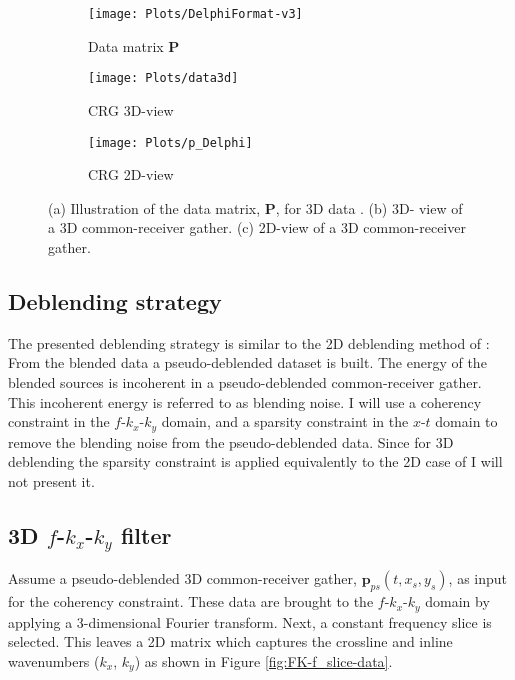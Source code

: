 \documentclass{madrid15WS}
\begin{document}
\begin{figure}[h!]
	
	\centering
	\begin{subfigure}[t]{0.4\textwidth}
		\centering
		\texttt{[image: Plots/DelphiFormat-v3]}
		\caption{Data matrix $\mathbf{P}$}
		\label{fig:DelphiFormat}
	\end{subfigure}
	\qquad  
	\centering
	\begin{subfigure}[t]{0.3\textwidth}
		\centering
		\texttt{[image: Plots/data3d]}
		\caption{CRG 3D-view}
		\label{fig:CRG_3D-view}
	\end{subfigure}
	
	\centering
	\begin{subfigure}[t]{0.8\textwidth}
		\centering
		\texttt{[image: Plots/p\_Delphi]}
		\caption{CRG 2D-view}
		\label{fig:CRG_2D-view}
	\end{subfigure}
	
	\caption{(a) Illustration of the data matrix, $\mathbf{P}$, for 3D data \citep{Delphi-Format}. (b) 3D- view of a 3D common-receiver gather. (c) 2D-view of a 3D common-receiver gather.}
	\label{fig:DataSorting}
\end{figure}


\subsection{Deblending strategy}

The presented deblending strategy is similar to the 2D deblending method of \citet{Mahdad-Deblending-Method}: From the blended data a pseudo-deblended dataset is built. The energy of the blended sources is incoherent in a pseudo-deblended common-receiver gather. This incoherent energy is referred to as blending noise. I will use a coherency constraint in the $f$-$k_x$-$k_y$ domain, and a sparsity constraint in the $x$-$t$ domain to remove the blending noise from the pseudo-deblended data. Since for 3D deblending the sparsity constraint is applied equivalently to the 2D case of \citet{Mahdad-Deblending-Method} I will not present it.


\subsection{3D $f$-$k_x$-$k_y$ filter}

Assume a pseudo-deblended 3D common-receiver gather, $\mathbf{p}_{ps}(t, x_s, y_s)$, as input for the coherency constraint. These data are brought to the $f$-$k_x$-$k_y$ domain by applying a 3-dimensional Fourier transform. Next, a constant frequency slice is selected. This leaves a 2D matrix which captures the crossline and inline wavenumbers ($k_x$, $k_y$) as shown in Figure \ref{fig:FK-f_slice-data}.
\end{document}
